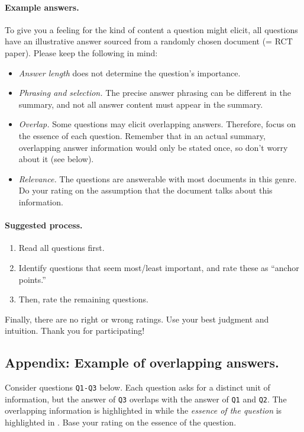 \paragraph{Example answers.}
To give you a feeling for the kind of content a question might elicit, all questions have an illustrative answer sourced from a randomly chosen document (= RCT paper). Please keep the following in mind:
%
\begin{itemize}[noitemsep]
    \item \emph{Answer length} does not determine the question's importance.
    \item \emph{Phrasing and selection.} The precise answer phrasing can be different in the summary, and not all answer content must appear in the summary.
    \item \emph{Overlap.} Some questions may elicit overlapping answers. Therefore, focus on the essence of each question. Remember that in an actual summary, overlapping answer information would only be stated once, so don't worry about it (see below).
    \item \emph{Relevance.} The questions are answerable with most documents in this genre. Do your rating on the assumption that the document talks about this information.
\end{itemize}
%
\paragraph{Suggested process.}
%
\begin{enumerate}[noitemsep]
    \item Read all questions first.
    \item Identify questions that seem most/least important, and rate these as “anchor points.”
    \item Then, rate the remaining questions.
\end{enumerate}
%
Finally, there are no right or wrong ratings. Use your best judgment and intuition. Thank you for participating!

\subsection*{Appendix: Example of overlapping answers.}
Consider questions \texttt{Q1-Q3} below. Each question asks for a distinct unit of information, but the answer of \texttt{Q3} overlaps with the answer of \texttt{Q1} and \texttt{Q2}. The overlapping information is highlighted in  while the \emph{essence of the question} is highlighted in . Base your rating on the essence of the question.

